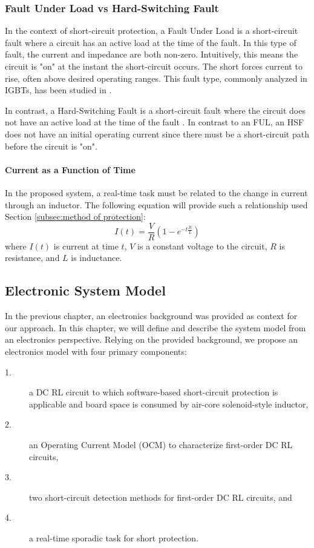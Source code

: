 \subsubsection{Fault Under Load vs Hard-Switching Fault}
In the context of short-circuit protection, a Fault Under Load is a short-circuit fault where a circuit has an active load at the time of the fault. In this type of fault, the current and impedance are both non-zero. Intuitively, this means the circuit is "on" at the instant the short-circuit occurs. The short forces current to rise, often above desired operating ranges. This fault type, commonly analyzed in IGBTs, has been studied in \cite{scanalysis}.

In contrast, a Hard-Switching Fault is a short-circuit fault where the circuit does not have an active load at the time of the fault \cite{hiSpeedProtection}. In contrast to an FUL, an HSF does not have an initial operating current since there must be a short-circuit path before the circuit is "on".

\paragraph{Current as a Function of Time}
In the proposed system, a real-time task must be related to the change in current through an inductor. The following equation will provide such a relationship used Section \ref{subsec:method of protection}:
\begin{equation}\label{eq:CurrentAtTime}
I(t) = \frac{V}{R}(1-e^{-t \frac{R}{L}})
\end{equation}
where $I(t)$ is current at time $t$, $V$ is a constant voltage to the circuit, $R$ is resistance, and $L$ is inductance.
\clearpage \subsection{Electronic System Model}\label{subsec:electronic system model}
In the previous chapter, an electronics background was provided as context for our approach. In this chapter, we will define and describe the system model from an electronics perspective. Relying on the provided background, we propose an electronics model with four primary components:
\begin{description}
\item [1.] a DC RL circuit to which software-based short-circuit protection is applicable and board space is consumed by air-core solenoid-style inductor,
\item [2.] an Operating Current Model (OCM) to characterize first-order DC RL circuits,
\item [3.] two short-circuit detection methods for first-order DC RL circuits, and
\item [4.] a real-time sporadic task for short protection.
\end{description}

